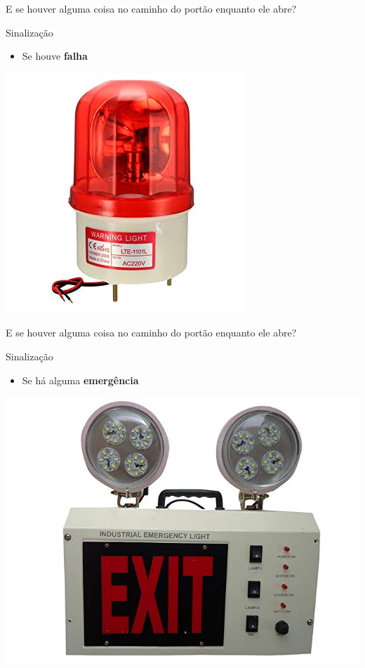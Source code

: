 \begin{frame}{E se houver alguma coisa no caminho do portão enquanto ele abre?}
\begin{block}{Sinalização}
	\begin{itemize}
		\item Se houve \textbf{falha}
	\end{itemize}
\end{block}
\medskip
\centerline{\includegraphics[width=0.4\linewidth]{Figuras/Ch05/fig16.jpg}}
\end{frame}

\begin{frame}{E se houver alguma coisa no caminho do portão enquanto ele abre?}
\begin{block}{Sinalização}
	\begin{itemize}
		\item Se há alguma \textbf{emergência}
	\end{itemize}
\end{block}
\medskip
\centerline{\includegraphics[width=0.5\linewidth]{Figuras/Ch05/fig17.jpg}}
\end{frame}



